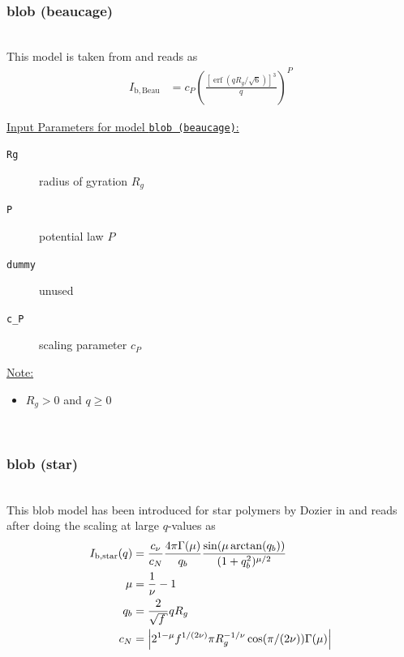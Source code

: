 ~\\
\subsubsection{blob (beaucage)}
\label{sect:Blob(Beaucage)}
~\\

This model is taken from \cite{beaucage95,beaucage96} and reads as
\begin{align}\label{eq:blob_beaucage}
  I_\mathrm{b,Beau} &= c_P  \left(\frac{\left[\operatorname{erf}\left(q R_g/\sqrt{6}\right)\right]^3}{q} \right)^P
\end{align}

\vspace{3mm}

\uline{Input Parameters for model \texttt{blob (beaucage)}:}
\begin{description}
\item[\texttt{Rg}] radius of gyration $R_g$
\item[\texttt{P}] potential law $P$
\item[\texttt{dummy}] unused
\item[\texttt{c\_P}] scaling parameter $c_P$
\end{description}

\uline{Note:}
\begin{itemize}
\item $R_g>0$ and $q\geq 0$
\end{itemize}


~\\
\subsubsection{blob (star)}
\label{sect:Blob(star)}
~\\

This blob model has been introduced for star polymers by Dozier in \cite{dozier91} and reads after doing the scaling at large $q$-values as
\begin{align}\label{eq:blob_star}
  I_\mathrm{b,star}(q) &= \frac{c_\nu}{c_N}  \frac{4 \pi \Gamma(\mu)}{q_b} \frac{\sin(\mu\arctan(q_b))}{(1 + q_b^2)^{\mu/2}} \\
  \mu &= \frac{1}{\nu}-1 \\
  q_b &= \frac{2}{\sqrt{f}} q R_g  \\
  c_N &= \abs{2^{1-\mu} f^{1/(2\nu)} \pi R_g^{-1/\nu}
        \cos(\pi/(2\nu))\Gamma(\mu)}
\end{align}

